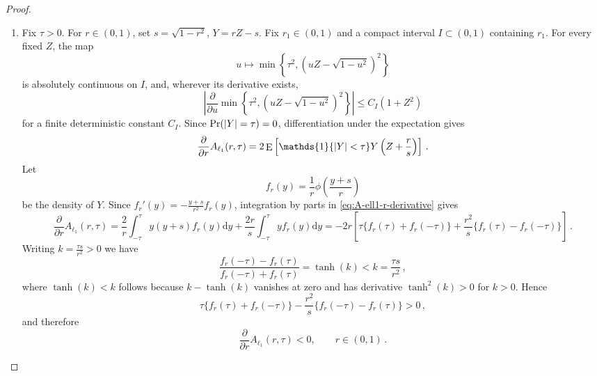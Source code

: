 \documentclass{article}
\makeatletter
\DeclareMathOperator{\expect}{E}
\theoremstyle{definition}
\newcommand{\abs}[1]{%
	\ensuremath{%
		\if@display
		\left| #1 \right|
		\else
		\lvert #1 \rvert
		\fi
	}%
}
\makeatother
\begin{document}
\begin{bibunit}
\begin{proof}
\begin{enumerate}[label=(\roman{*})]
$$\begin{aligned}
				\lim\limits_{\tau \to 0} \mathrm{E}[\min\{W(r)^2, \tau^2\}] &= \mathrm{E}[\lim\limits_{\tau \to 0} \min\{W(r)^2, \tau^2\}] = 0\,.
			\end{aligned}
        $$
\item  		Fix $\tau>0$. For $r\in(0,1)$, set
		$
			s=\sqrt{1-r^2}$, $
			Y=rZ-s
		$. 
		Fix $r_1\in(0,1)$ and a compact interval
		$I\subset(0,1)$ containing $r_1$. For every fixed $Z$, the map
		$$
			u\mapsto
			\min\left\{
				\tau^2,
				\left(uZ-\sqrt{1-u^2}\right)^2
			\right\}
		$$
		is absolutely continuous on $I$, and, wherever its derivative
		exists,
		$$
			\left|
				\frac{\partial}{\partial u}
				\min\left\{
					\tau^2,
					\left(uZ-\sqrt{1-u^2}\right)^2
				\right\}
			\right|
			\leq
			C_I(1+Z^2)
		$$
		for a finite deterministic constant $C_I$. Since
		$\Pr(\abs{Y}=\tau)=0$, differentiation under the expectation gives
		\begin{equation}
		\label{eq:A-ell1-r-derivative}
			\frac{\partial}{\partial r}
			A_{\ell_1}(r,\tau)
			=
			2\expect\left[
				\mathds{1}\{\abs{Y}<\tau\}
				Y
				\left(
					Z+\frac{r}{s}
				\right)
			\right]\,.
		\end{equation}
		Let
		$$
			f_r(y)
			=
			\frac1r
			\phi\left(
				\frac{y+s}{r}
			\right)
		$$
		be the density of $Y$. Since
		$
			f_r'(y)
			=
			-\frac{y+s}{r^2}f_r(y)
		$, 
		integration by parts in \eqref{eq:A-ell1-r-derivative} gives
		\begin{equation}
			\frac{\partial}{\partial r}
			A_{\ell_1}(r,\tau)
			=
			\frac2r
			\int_{-\tau}^{\tau}
			y(y+s)f_r(y)\mathrm dy
			+
			\frac{2r}{s}
			\int_{-\tau}^{\tau}
			yf_r(y) \mathrm dy
			=
			-2r
			\left[
				\tau\{f_r(\tau)+f_r(-\tau)\}
				+
				\frac{r^2}{s}
				\{f_r(\tau)-f_r(-\tau)\}
			\right] \,. 
		\end{equation}
		Writing
		$
			k=\frac{\tau s}{r^2}>0 
		$ 
		we have
		$$
			\frac{
				f_r(-\tau)-f_r(\tau)
			}{
				f_r(-\tau)+f_r(\tau)
			}
			=
			\tanh(k)
			<
			k
			=
			\frac{\tau s}{r^2} \,, 
		$$
		where $\tanh(k)<k$ follows because
		$k-\tanh(k)$ vanishes at zero and has derivative
		$\tanh^2(k)>0$ for $k>0$. Hence
		$$
			\tau\{f_r(\tau)+f_r(-\tau)\}
			-
			\frac{r^2}{s}
			\{f_r(-\tau)-f_r(\tau)\}
			>
			0\,, 
		$$
		and therefore
		$$
			\frac{\partial}{\partial r}
			A_{\ell_1}(r,\tau)
			<
			0,
			\qquad
			r\in(0,1) \,. 
		$$


\end{enumerate}
\end{proof}
\end{bibunit}
\end{document}
